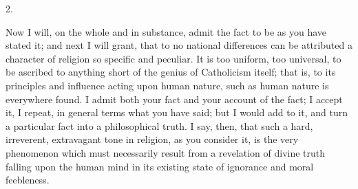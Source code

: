 2.

Now I will, on the whole and in substance, admit the fact to be as
you have stated it; and next I will grant, that to no national
differences can be attributed a character of religion so specific and
peculiar. It is too uniform, too universal, to be ascribed to anything
short of the genius of Catholicism itself; that is, to its principles
and influence acting upon human nature, such as human nature is
everywhere found. I admit both your fact and your account of the fact;
I accept it, I repeat, in general terms what you have said; but I
would add to it, and turn a particular fact into a philosophical
truth. I say, then, that such a hard, irreverent, extravagant tone in
religion, as you consider it, is the very phenomenon which must
necessarily result from a revelation of divine truth falling upon the
human mind in its existing state of ignorance and moral feebleness.


